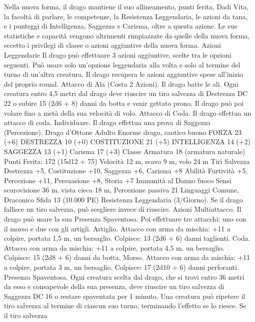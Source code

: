 \begin{multicols}{2}
Nella nuova forma, il drago mantiene il suo allineamento, punti
ferita, Dadi Vita, la facoltà di parlare, le competenze, la Resistenza
Leggendaria, le azioni da tana, e i punteggi di Intelligenza, Saggezza
e Carisma, oltre a questa azione. Le sue statistiche e capacità
vengono altrimenti rimpiazzate da quelle della nuova forma, eccetto i
privilegi di classe o azioni aggiuntive della nuova forma.
Azioni Leggendarie
Il drago può effettuare 3 azioni aggiuntive, scelte tra le opzioni
seguenti. Può usare solo un’opzione leggendaria alla volta e solo
al termine del turno di un’altra creatura. Il drago recupera le
azioni aggiuntive spese all’inizio del proprio round.
Attacco di Ala (Costa 2 Azioni). Il drago batte le ali. Ogni
creatura entro 4,5 metri dal drago deve riuscire un tiro salvezza
di Destrezza DC 22 o subire 15 (2d6 + 8) danni da botta e
venir gettato prono. Il drago può poi volare fino a metà della sua
velocità di volo.
Attacco di Coda. Il drago effettua un attacco di coda.
Individuare. Il drago effettua una prova di Saggezza
(Percezione).
Drago d’Ottone Adulto
Enorme drago, caotico buono
FORZA 23 (+6)
DESTREZZA 10 (+0)
COSTITUZIONE 21 (+5)
INTELLIGENZA 14 (+2)
SAGGEZZA 13 (+1)
Carisma 17 (+3)
Classe Armatura 18 (armatura naturale)
\hspace*{0pt}\hfill{Punti Ferita}: 172 (15d12 + 75)
Velocità 12 m, scavo 9 m, volo 24 m
Tiri Salvezza Destrezza +5, Costituzione +10, Saggezza +6,
Carisma +8
Abilità Furtività +5, Percezione +11, Persuasione +8, Storia +7
Immunità al Danno fuoco
Sensi scurovisione 36 m, vista cieca 18 m, Percezione passiva 21
Linguaggi Comune, Draconico
Sfida 13 (10.000 PE)
Resistenza Leggendaria (3/Giorno). Se il drago fallisce un tiro
salvezza, può scegliere invece di riuscire.
Azioni
Multiattacco. Il drago può usare la sua Presenza Spaventosa. Poi
effettuare tre attacchi: uno con il morso e due con gli artigli.
Artiglio. Attacco con arma da mischia: +11 a colpire, portata 1,5
m, un bersaglio.
Colpisce: 13 (2d6 + 6) danni taglienti.
Coda. Attacco con arma da mischia: +11 a colpire, portata 4,5
m, un bersaglio.
Colpisce: 15 (2d8 + 6) danni da botta.
Morso. Attacco con arma da mischia: +11 a colpire, portata 3 m,
un bersaglio.
Colpisce: 17 (2d10 + 6) danni perforanti.
Presenza Spaventosa. Ogni creatura scelta dal drago, che si trovi
entro 36 metri da esso e consapevole della sua presenza, deve
riuscire un tiro salvezza di Saggezza DC 16 o restare spaventata per
1 minuto. Una creatura può ripetere il tiro salvezza al termine di
ciascun suo turno, terminando l’effetto se lo riesce. Se il tiro salvezza

\end{multicols}
